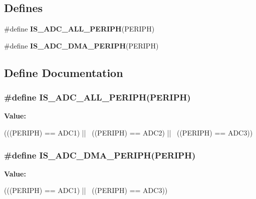 \subsection*{Defines}
\begin{DoxyCompactItemize}
\item 
\#define {\bfseries IS\_\-ADC\_\-ALL\_\-PERIPH}(PERIPH)
\item 
\#define {\bfseries IS\_\-ADC\_\-DMA\_\-PERIPH}(PERIPH)
\end{DoxyCompactItemize}


\subsection{Define Documentation}
\hypertarget{group__ADC__Exported__Constants_gaf5d6bd0153464912e0eaccb1af1aefb2}{
\subsubsection[{IS\_\-ADC\_\-ALL\_\-PERIPH}]{\setlength{\rightskip}{0pt plus 5cm}\#define IS\_\-ADC\_\-ALL\_\-PERIPH(PERIPH)}}
\label{group__ADC__Exported__Constants_gaf5d6bd0153464912e0eaccb1af1aefb2}
{\bfseries Value:}
\begin{DoxyCode}
(((PERIPH) == ADC1) || \
                                   ((PERIPH) == ADC2) || \
                                   ((PERIPH) == ADC3))
\end{DoxyCode}
\hypertarget{group__ADC__Exported__Constants_ga56ce1703cee9a93969fc507b985ee949}{
\subsubsection[{IS\_\-ADC\_\-DMA\_\-PERIPH}]{\setlength{\rightskip}{0pt plus 5cm}\#define IS\_\-ADC\_\-DMA\_\-PERIPH(PERIPH)}}
\label{group__ADC__Exported__Constants_ga56ce1703cee9a93969fc507b985ee949}
{\bfseries Value:}
\begin{DoxyCode}
(((PERIPH) == ADC1) || \
                                   ((PERIPH) == ADC3))
\end{DoxyCode}
